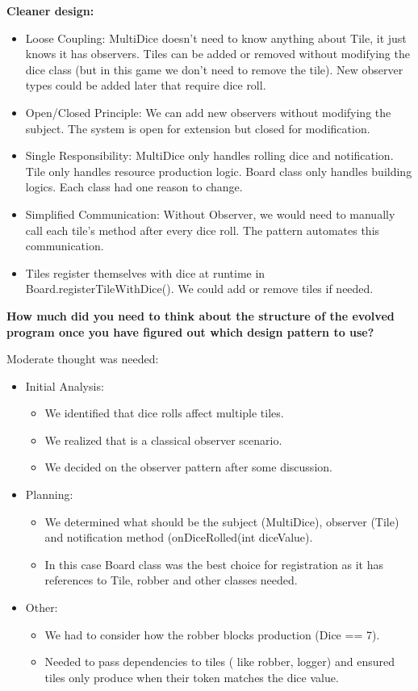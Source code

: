 \textbf{Cleaner design:}
\begin{itemize}
    \item Loose Coupling: MultiDice doesn’t need to know anything about Tile, it just knows it has observers. Tiles can be added or removed without modifying the dice class (but in this game we don't need to remove the tile). New observer types could be added later that require dice roll. 
    \item Open/Closed Principle: We can add new observers without modifying the subject. The system is open for extension but closed for modification. 
    \item Single Responsibility: MultiDice only handles rolling dice and notification. Tile only handles resource production logic. Board class only handles building logics. Each class had one reason to change. 
    \item Simplified Communication: Without Observer, we would need to manually call each tile’s method after every dice roll. The pattern automates this communication. 
    \item Tiles register themselves with dice at runtime in Board.registerTileWithDice(). We could add or remove tiles if needed. 
\end{itemize}



\textbf{How much did you need to think about the structure of the evolved program once
you have figured out which design pattern to use?}

Moderate thought was needed: 

\begin{itemize}
    \item Initial Analysis: 
    \begin{itemize}
        \item We identified that dice rolls affect multiple tiles.
        \item We realized that is a classical observer scenario.
        \item We decided on the observer pattern after some discussion.
    \end{itemize}

    \item Planning: 
    \begin{itemize}
        \item We determined what should be the subject (MultiDice), observer (Tile) and notification method (onDiceRolled(int diceValue). 
        \item In this case Board class was the best choice for registration as it has references to Tile, robber and other classes needed. 
    \end{itemize}

    \item Other: 
    \begin{itemize}
        \item We had to consider how the robber blocks production (Dice == 7). 
        \item Needed to pass dependencies to tiles ( like robber, logger)  and ensured tiles only produce when their token matches the dice value.
    \end{itemize}
\end{itemize}

